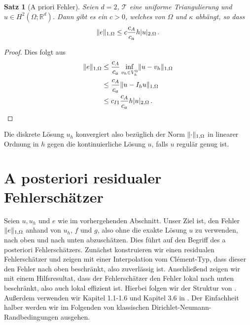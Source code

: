 \documentclass{scrartcl}
\newcounter{everything}
\newtheorem{theorem}[everything]{Satz}
\def\R{\mathbb{R}}
\newcommand{\cT}{\mathcal{T}}
\DeclarePairedDelimiter{\abs}{\lvert}{\rvert}
\DeclarePairedDelimiter{\norm}{\lVert}{\rVert}
\begin{document}
\begin{theorem}[A priori Fehler]\label{pr:APrioriFehler}
	Seien $d=2$, $\cT$ eine uniforme Triangulierung und $u\in H^2(\Omega;\R^d)$. Dann gibt es ein $c>0$, welches von $\Omega$ und $\kappa$ abhängt, so dass
	\begin{align*}
		\norm{e}_{1,\Omega}\leq c\frac{c_A}{c_a}h \abs{u}_{2,\Omega}\,.
	\end{align*}
\end{theorem}
\begin{proof}
	Dies folgt aus
	\begin{align*}
		\norm{e}_{1,\Omega}
		&\leq \frac{c_A}{c_a} \inf_{v_h\in V^0_h}\norm{u-v_h}_{1,\Omega} \\
		&\leq \frac{c_A}{c_a} \norm{u-I_hu}_{1,\Omega} \\
		&\leq c_{I1}\frac{c_A}{c_a} h \abs{u}_{2,\Omega}\,.
	\end{align*}
\end{proof}
Die diskrete Lösung $u_h$ konvergiert also bezüglich der Norm $\norm{\cdot}_{1,\Omega}$ in linearer Ordnung in $h$ gegen die kontinuierliche Lösung $u$, falls $u$ regulär genug ist.


\section{A posteriori residualer Fehlerschätzer}


Seien $u,u_h$ und $e$ wie im vorhergehenden Abschnitt. 
Unser Ziel ist, den Fehler $\norm{e}_{1,\Omega}$ anhand von $u_h$, $f$ und $g$, also ohne die exakte Lösung $u$ zu verwenden, nach oben und nach unten abzuschätzen. Dies führt auf den Begriff des a posteriori Fehlerschätzers. Zunächst konstruieren wir einen residualen Fehlerschätzer und zeigen mit einer Interpolation vom Clément-Typ, dass dieser den Fehler nach oben beschränkt, also zuverlässig ist. Anschließend zeigen wir mit einem Hilfsresultat, dass der Fehlerschätzer den Fehler lokal nach unten beschränkt, also auch lokal effizient ist. Hierbei folgen wir der Struktur von \cite[Kapitel III.§8]{Bra-2007}. Außerdem verwenden wir Kapitel 1.1-1.6 und Kapitel 3.6 in \cite{Ver-2013}. Der Einfachheit halber werden wir im Folgenden von klassischen Dirichlet-Neumann-Randbedingungen ausgehen.
\end{document}

